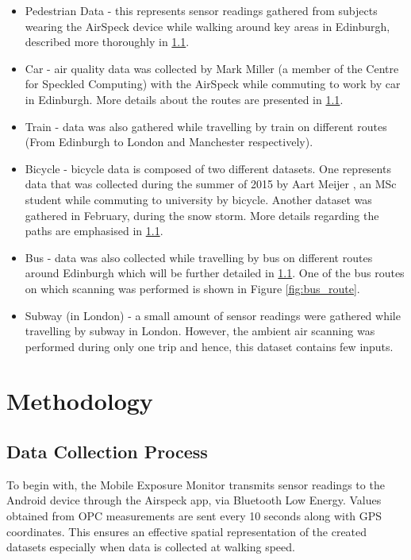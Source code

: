 \documentclass[bsc,frontabs,twoside,singlespacing, parskip,deptreport]{infthesis}     %
\begin{document}
\begin{itemize}

\item Pedestrian Data - this represents sensor readings gathered from subjects wearing the AirSpeck device while walking around key areas in Edinburgh, described more thoroughly in \ref{sec:data-collection}.

\item Car - air quality data was collected by Mark Miller (a member of the Centre for Speckled Computing) with the AirSpeck while commuting to work by car in Edinburgh. More details about the routes are presented in \ref{sec:data-collection}.

\item Train - data was also gathered while travelling by train on different routes (From Edinburgh to London and Manchester respectively).

\item Bicycle - bicycle data is composed of two different datasets. One represents data that was collected during the summer of 2015 by Aart Meijer \cite{Meijer2015}, an MSc student while commuting to university by bicycle. Another dataset was gathered in February, during the snow storm. More details regarding the paths are emphasised in \ref{sec:data-collection}.

\item Bus - data was also collected while travelling by bus on different routes around Edinburgh which will be further detailed in \ref{sec:data-collection}. One of the bus routes on which scanning was performed is shown in Figure \ref{fig:bus_route}.

\item Subway (in London) - a small amount of sensor readings were gathered while travelling by subway in London. However, the ambient air scanning was performed during only one trip and hence, this dataset contains few inputs.
\end{itemize}

\chapter{Methodology}

\section{Data Collection Process}
\label{sec:data-collection}

To begin with, the Mobile Exposure Monitor transmits sensor readings to the Android device through the Airspeck app, via Bluetooth Low Energy. Values obtained from OPC measurements are sent every 10 seconds along with GPS coordinates. This ensures an effective spatial representation of the created datasets especially when data is collected at walking speed.
\end{document}
